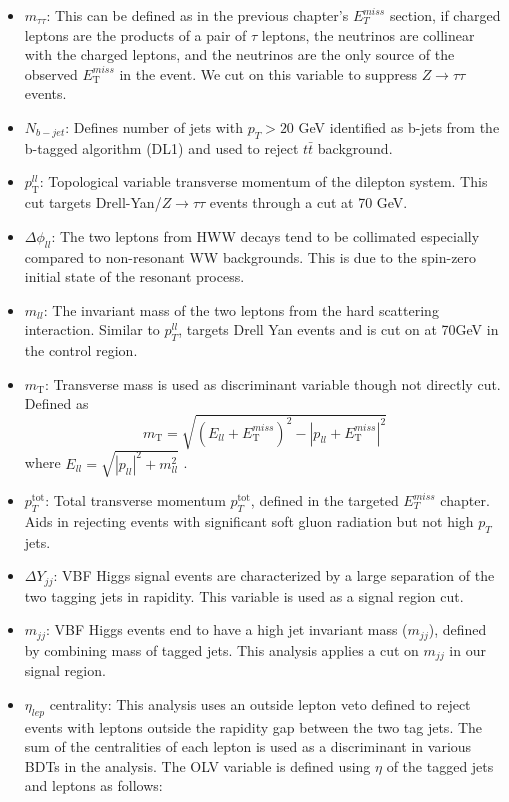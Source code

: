 \begin{itemize}
\item $m_{\tau \tau}$: This can be defined as in the previous chapter's $E_T^{miss}$ section, if charged leptons are the products of a pair of $\tau$ leptons, the neutrinos are collinear with the charged leptons, and the neutrinos are the only source of the observed $E_\mathrm{{T}}^{miss}$ in the event. We cut on this variable to suppress $Z\rightarrow\tau\tau$  events. 
\item $N_{b-jet}$: Defines number of jets with $p_T >20$ GeV identified as b-jets from the b-tagged algorithm (DL1) and used to reject $t\bar{t}$ background.
\item $p_\mathrm{{T}}^{ll}$: Topological variable transverse momentum of the dilepton system. This cut targets Drell-Yan/$Z\rightarrow\tau\tau$ events through a cut at 70 GeV. 
\item $\Delta \phi_{ll}$: The two leptons from HWW decays tend to be collimated especially compared to non-resonant WW backgrounds. This is due to the spin-zero initial state of the resonant process. 
\item $m_{ll}$: The invariant mass of the two leptons from the hard scattering interaction. Similar to $p_T^{ll}$, targets Drell Yan events and is cut on at 70GeV in the control region.
\item $m_\mathrm{{T}}$: Transverse mass is used as discriminant variable though not directly cut. Defined as
\begin{equation}
m_\mathrm{{T}} = \sqrt{ {(E_{ll} + E_\mathrm{{T}}^{miss})}^2 - {|p_{ll} + E_\mathrm{{T}}^{miss}|}^2 }
\end{equation}
  where $E_{ll} = \sqrt{|p_{ll}|^2 + m_{ll}^2 }$ .
\item $p_T^\mathrm{tot}$:
Total transverse momentum $p_T^\mathrm{tot}$, defined in the targeted $E_T^{miss}$ chapter. Aids in rejecting events with significant soft gluon radiation but not high $p_T$ jets.
\item  $\Delta Y_{jj}$: VBF Higgs signal events are characterized by a large separation of the two tagging jets in rapidity. This variable is used as a signal region cut. 
\item $m_{jj}$:
VBF Higgs events end to have a high jet invariant mass ($m_{jj}$), defined by combining mass of tagged jets. This analysis applies a cut on $m_{jj}$ in our signal region. 
\item $\eta_{lep}$ centrality: This analysis uses an outside lepton veto defined to reject events with leptons outside the rapidity gap between the two tag jets. The sum of the centralities of each lepton is used as a discriminant in various BDTs in the analysis. The OLV variable is defined using $\eta$ of the tagged jets and leptons as follows:

\end{itemize}

